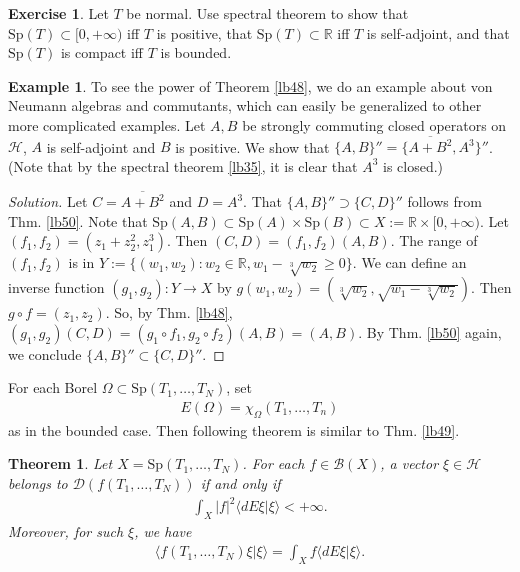\documentclass[12pt,a4paper,notitlepage]{article}
\theoremstyle{definition}
\newtheorem{eg}[df]{Example}
\newtheorem{exe}[df]{Exercise}
\theoremstyle{plain}
\newtheorem{thm}[df]{Theorem}
\newcommand{\mc}{\mathcal}
\newcommand{\ovl}{\overline}
\newcommand{\Dom}{\scr D}
\newcommand{\bk}[1]{\langle {#1}\rangle}
\newcommand{\scr}{\mathscr}
\newcommand{\mbb}{\mathbb}
\newcommand{\Rbb}{\mathbb R}
\newcommand{\Sp}{\mathrm{Sp}}
\numberwithin{equation}{section}
\begin{document}
\begin{exe}
Let $T$ be normal. Use spectral theorem to show that $\Sp(T)\subset[0,+\infty)$ iff $T$ is positive,  that $\Sp(T)\subset\Rbb$ iff $T$ is self-adjoint, and that $\Sp(T)$  is compact iff $T$ is bounded.
\end{exe}



\begin{eg}
To see the power of Theorem \ref{lb48}, we do an example about von Neumann algebras and commutants, which can easily be generalized to other more complicated examples. Let $A,B$ be strongly commuting closed operators on $\mc H$, $A$ is self-adjoint and $B$ is positive. We show that $\{A,B\}''=\{\ovl{A+B^2},A^3\}''$. (Note that by the spectral theorem \ref{lb35}, it is clear that $A^3$ is closed.)
\end{eg}
\begin{proof}[Solution]
Let $C=\ovl{A+B^2}$ and $D=A^3$. That $\{A,B\}''\supset\{C,D\}''$ follows from Thm. \ref{lb50}. Note that $\Sp(A,B)\subset \Sp(A)\times\Sp(B)\subset X:=\mbb R\times[0,+\infty)$. Let $(f_1,f_2)=(z_1+z_2^2,z_1^3)$. Then $(C,D)=(f_1,f_2)(A,B)$. The range of $(f_1,f_2)$ is in $Y:=\{(w_1,w_2):w_2\in\Rbb,w_1-\sqrt[3]{w_2}\geq 0\}$. We can define an inverse function $(g_1,g_2):Y\rightarrow X$ by $g(w_1,w_2)=(\sqrt[3]{w_2},\sqrt{w_1-\sqrt[3]{w_2}})$. Then $g\circ f=(z_1,z_2)$. So, by Thm. \ref{lb48}, $(g_1,g_2)(C,D)=(g_1\circ f_1,g_2\circ f_2)(A,B)=(A,B)$. By Thm. \ref{lb50} again, we conclude $\{A,B\}''\subset\{C,D\}''$.
\end{proof}



For each Borel $\Omega\subset\Sp(T_1,\dots,T_N)$, set
\begin{align}
	E(\Omega)=\chi_\Omega(T_1,\dots,T_n)
\end{align}
as in the bounded case. Then following theorem is similar to Thm. \ref{lb49}.

\begin{thm}
Let $X=\Sp(T_1,\dots,T_N)$. For each $f\in\scr B(X)$, a vector $\xi\in\mc H$ belongs to $\Dom(f(T_1,\dots,T_N))$ if and only if
\begin{align*}
\int_X |f|^2\bk{dE\xi|\xi}<+\infty.	
\end{align*}
Moreover, for such $\xi$, we have
\begin{align}
\bk{f(T_1,\dots,T_N)\xi|\xi}=\int_X f\bk{dE\xi|\xi}.
\end{align}
\end{thm}
\end{document}
